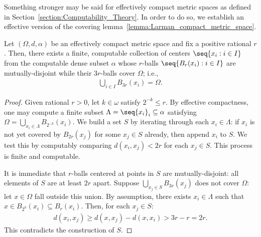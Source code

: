 
Something stronger may be said for effectively compact metric spaces as defined in Section~\ref{section:Computability_Theory}. In order to do so, we establish an effective version of the covering lemma~\ref{lemma:Larman_compact_metric_space}. 

\begin{lemma}
    \label{lemma:effectivized_Larman_compact_metric_space}
    Let $(\Omega, d, \alpha)$ be an effectively compact metric space and fix a positive rational $r$. Then, there exists a finite, computable collection of centers $\seq{x_i: i \in I}$ from the computable dense subset $\alpha$ whose $r$-balls $\seq{B_r(x_i) : i \in I}$ are mutually-disjoint while their $3r$-balls cover $\Omega$; i.e., 
    \begin{align*}
        \bigcup_{i \in I} B_{3r}(x_i) = \Omega.
    \end{align*}
\end{lemma}
\begin{proof}    
    Given rational $r > 0$, let $k \in \omega$ satisfy $2^{-k} \leq r$. By effective compactness, one may compute a finite subset $\Lambda = \seq{x_i}_i \subseteq \alpha$ satisfying $\Omega = \bigcup_{x_i \in \Lambda} B_{2^{-k}}(x_i)$. We build a set $S$ by iterating through each $x_i \in \Lambda$: if $x_i$ is not yet covered by $B_{2r}(x_j)$ for some $x_j \in S$ already, then append $x_i$ to $S$. We test this by computably comparing $d(x_i, x_j) < 2r$ for each $x_j \in S$. This process is finite and computable.

    It is immediate that $r$-balls centered at points in $S$ are mutually-disjoint: all elements of $S$ are at least $2r$ apart. Suppose $\bigcup_{x_j \in S} B_{3r}(x_j)$ does not cover $\Omega$: let $x \in \Omega$ fall outside this union. By assumption, there exists $x_i \in \Lambda$ such that $x \in B_{2^k}(x_i) \subseteq B_r(x_i)$. Then, for each $x_j \in S$:
    \begin{align*}
        d(x_i, x_j) \geq d(x, x_j) - d(x, x_i) > 3r - r = 2r.
    \end{align*}
    This contradicts the construction of $S$. 
\end{proof}


